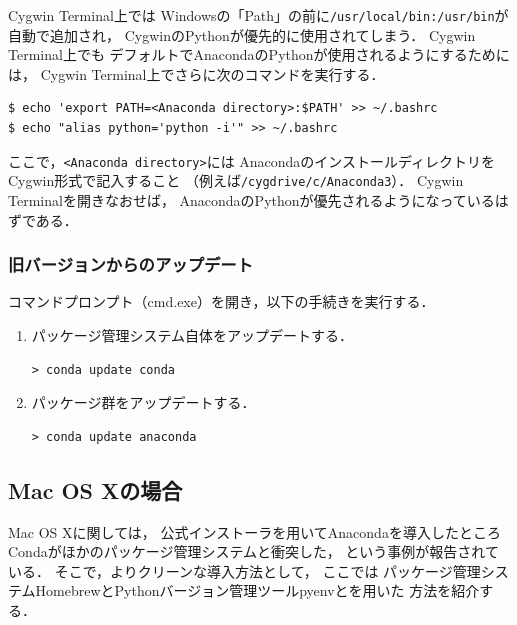 \begin{attention}
Cygwin Terminal上では
Windowsの「Path」の前に\verb|/usr/local/bin:/usr/bin|が自動で追加され，
CygwinのPythonが優先的に使用されてしまう．
Cygwin Terminal上でも
デフォルトでAnacondaのPythonが使用されるようにするためには，
Cygwin Terminal上でさらに次のコマンドを実行する．
\begin{lstlisting}[style=cmdline]
$ echo 'export PATH=<Anaconda directory>:$PATH' >> ~/.bashrc
$ echo "alias python='python -i'" >> ~/.bashrc
\end{lstlisting}
ここで，\verb|<Anaconda directory>|には
AnacondaのインストールディレクトリをCygwin形式で記入すること
（例えば\verb|/cygdrive/c/Anaconda3|）．
Cygwin Terminalを開きなおせば，
AnacondaのPythonが優先されるようになっているはずである．
\end{attention}


\subsubsection{旧バージョンからのアップデート}
コマンドプロンプト（cmd.exe）を開き，以下の手続きを実行する．
\begin{enumerate}
\item
パッケージ管理システム自体をアップデートする．
\begin{lstlisting}[style=cmdline]
> conda update conda
\end{lstlisting}
\item
パッケージ群をアップデートする．
\begin{lstlisting}[style=cmdline]
> conda update anaconda
\end{lstlisting}
\end{enumerate}


\subsection{Mac OS Xの場合}
\begin{attention}
Mac OS Xに関しては，
公式インストーラを用いてAnacondaを導入したところ
Condaがほかのパッケージ管理システムと衝突した，
という事例が報告されている．
そこで，よりクリーンな導入方法として，
ここでは
パッケージ管理システムHomebrewとPythonバージョン管理ツールpyenvとを用いた
方法を紹介する．
\end{attention}


